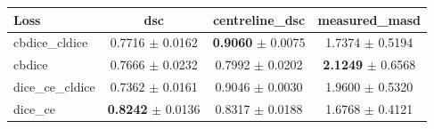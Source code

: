 \begin{tabular}{lccc}
\toprule
Loss & dsc & centreline\_dsc & measured\_masd \\
\midrule
cbdice\_cldice & 0.7716 $\pm$ 0.0162 & \textbf{0.9060} $\pm$ 0.0075 & 1.7374 $\pm$ 0.5194 \\
cbdice & 0.7666 $\pm$ 0.0232 & 0.7992 $\pm$ 0.0202 & \textbf{2.1249} $\pm$ 0.6568 \\
dice\_ce\_cldice & 0.7362 $\pm$ 0.0161 & 0.9046 $\pm$ 0.0030 & 1.9600 $\pm$ 0.5320 \\
dice\_ce & \textbf{0.8242} $\pm$ 0.0136 & 0.8317 $\pm$ 0.0188 & 1.6768 $\pm$ 0.4121 \\
\bottomrule
\end{tabular}
